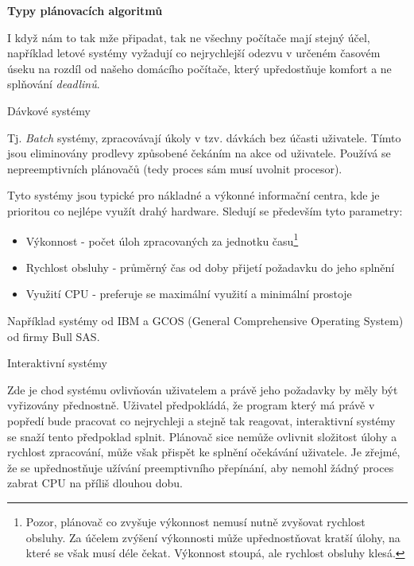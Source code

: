 \begin{Large}
    \textbf{Typy plánovacích algoritmů}
\end{Large}

I když nám to tak mže připadat, tak ne všechny počítače mají stejný účel, například letové systémy vyžadují co nejrychlejší odezvu v určeném časovém úseku na rozdíl od našeho domácího počítače, který upředostňuje komfort a ne splňování \textit{deadlinů}.

\begin{large}
    \vspace{0,5cm}
    Dávkové systémy
\end{large}

Tj. \textit{Batch} systémy, zpracovávají úkoly v tzv. dávkách bez účasti uživatele. Tímto jsou eliminovány prodlevy způsobené čekáním na akce od uživatele. Používá se nepreemptivních plánovačů (tedy proces sám musí uvolnit procesor). 

\vspace{0,5cm}

Tyto systémy jsou typické pro nákladné a výkonné informační centra, kde je prioritou co nejlépe využít drahý hardware. Sledují se především tyto parametry:

\begin{itemize}
    \item Výkonnost - počet úloh zpracovaných za jednotku času\footnote{Pozor, plánovač co zvyšuje výkonnost nemusí nutně zvyšovat rychlost obsluhy. Za účelem zvýšení výkonnosti může upřednostňovat kratší úlohy, na které se však musí déle čekat. Výkonnost stoupá, ale rychlost obsluhy klesá.} 
    \item Rychlost obsluhy - průměrný čas od doby přijetí požadavku do jeho splnění
    \item Využití CPU - preferuje se maximální využití a minimální prostoje
\end{itemize}

Například systémy od IBM a GCOS (General Comprehensive Operating System) od firmy Bull SAS.

\begin{large}
    \vspace{0,5cm}
    Interaktivní systémy
\end{large}

Zde je chod systému ovlivňován uživatelem a právě jeho požadavky by měly být vyřizovány přednostně. Uživatel předpokládá, že program který má právě v popředí bude pracovat co nejrychleji a stejně tak reagovat, interaktivní systémy se snaží tento předpoklad splnit. Plánovač sice nemůže ovlivnit složitost úlohy a rychlost zpracování, může však přispět ke splnění očekávání uživatele. Je zřejmé, že se upřednostňuje užívání preemptivního přepínání, aby nemohl žádný proces zabrat CPU na příliš dlouhou dobu. 


